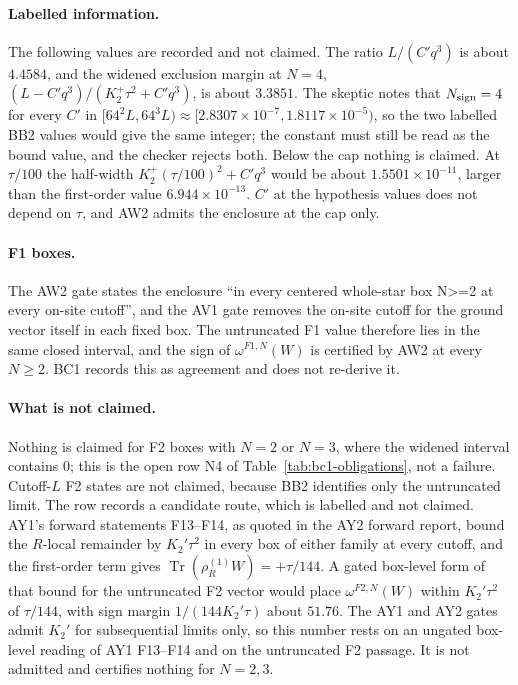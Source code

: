 \paragraph{Labelled information.} The following values are recorded and not
claimed. The ratio $L/(C'q^3)$ is about $4.4584$, and the widened exclusion
margin at $N=4$, $(L-C'q^3)/(K_2^+\tau^2+C'q^3)$, is about $3.3851$. The
skeptic notes that $N_{\rm sign}=4$ for every $C'$ in
$[64^2L,64^3L)\approx[2.8307\times10^{-7},1.8117\times10^{-5})$, so the two
labelled BB2 values would give the same integer; the constant must still be
read as the bound value, and the checker rejects both. Below the cap nothing
is claimed. At $\tau/100$ the half-width $K_2^+(\tau/100)^2+C'q^3$ would be
about $1.5501\times10^{-11}$, larger than the first-order value
$6.944\times10^{-13}$. $C'$ at the hypothesis values does not depend on
$\tau$, and AW2 admits the enclosure at the cap only.

\paragraph{F1 boxes.} The AW2 gate states the enclosure ``in every centered
whole-star box N>=2 at every on-site cutoff'', and the AV1 gate removes the
on-site cutoff for the ground vector itself in each fixed box. The untruncated
F1 value therefore lies in the same closed interval, and the sign of
$\omega^{F1,N}(W)$ is certified by AW2 at every $N\ge2$. BC1 records this as
agreement and does not re-derive it.

\paragraph{What is not claimed.} Nothing is claimed for F2 boxes with $N=2$
or $N=3$, where the widened interval contains 0; this is the open row N4 of
Table~\ref{tab:bc1-obligations}, not a failure. Cutoff-$L$ F2 states are not
claimed, because BB2 identifies only the untruncated limit. The row records a
candidate route, which is labelled and not claimed. AY1's forward statements
F13--F14, as quoted in the AY2 forward report, bound the $R$-local remainder
by $K_2'\tau^2$ in every box of either family at every cutoff, and the
first-order term gives $\operatorname{Tr}(\rho^{(1)}_RW)=+\tau/144$. A gated
box-level form of that bound for the untruncated F2 vector would place
$\omega^{F2,N}(W)$ within $K_2'\tau^2$ of $\tau/144$, with sign margin
$1/(144K_2'\tau)$ about $51.76$. The AY1 and AY2 gates admit $K_2'$ for
subsequential limits only, so this number rests on an ungated box-level
reading of AY1 F13--F14 and on the untruncated F2 passage. It is not
admitted and certifies nothing for $N=2,3$.

